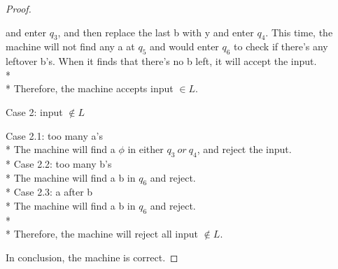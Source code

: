 \documentclass{article}
\begin{document}
\begin{multicols}{2}
\begin{proof}
\begin{addmargin}[1em]{0em}
            and enter $q_3$, and then replace the last b with y and enter $q_4$. This time, the
            machine will not find any a at $q_5$ and would enter $q_6$ to check if there's any leftover
            b's. When it finds that there's no b left, it will accept the input. \\*
            \\*
            Therefore, the machine accepts input $\in L$.
        \end{addmargin}
        Case 2: input $\notin L$
        \begin{addmargin}[1em]{0em}
            Case 2.1: too many a's\\*
            The machine will find a $\phi$ in either $q_3\ or\ q_4$, and reject the input.\\*
            Case 2.2: too many b's\\*
            The machine will find a b in $q_6$ and reject.\\*
            Case 2.3: a after b\\*
            The machine will find a b in $q_6$ and reject.\\*\\*
            Therefore, the machine will reject all input $\notin L$.
        \end{addmargin}
        In conclusion, the machine is correct.
    \end{proof}
\end{multicols}
\end{document}
